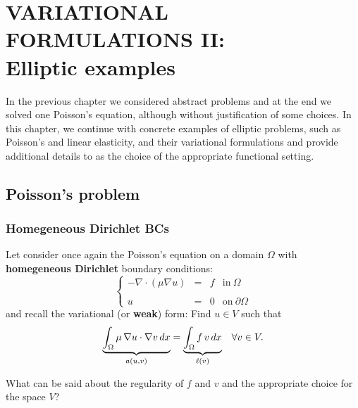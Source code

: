 \setchapterpreamble[u]{\margintoc}
\chapter{VARIATIONAL FORMULATIONS II:\\Elliptic examples}

In the previous chapter we considered abstract problems
and at the end we solved one Poisson's equation, although
without justification of some choices. In this chapter, 
we continue with concrete examples of elliptic problems,
such as Poisson's and linear elasticity, 
and their variational formulations and provide additional
details to as the choice of the appropriate functional
setting.

\section{Poisson's problem}

\subsection{Homegeneous Dirichlet BCs}

Let consider once again the Poisson's equation on a domain
$\Omega$ with \textbf{homegeneous Dirichlet} boundary conditions:
\begin{equation}
\left \{
\begin{array}{rcll}
-\nabla \cdot \left ( \mu \nabla{u} \right) & = & f & \mbox{in}~\Omega \\
& & & \\
u & = & 0 & \mbox{on}~\partial{\Omega}
\end{array}
\right.
\end{equation}
and recall the variational (or \textbf{weak}) form:
Find $u \in V$ such that
\begin{equation}
\begin{array}{ll}
\underbrace{\int_{\Omega}{\mu\,\nabla{u}\cdot \nabla{v}}\,dx}_{a(u,v)} =
        \underbrace{\int_{\Omega}{f\,v}\,dx}_{\ell(v)} & \forall v \in V. \labeq{poissonbasicag}
\end{array}
\end{equation}

What can be said about the regularity of $f$ and $v$ and the appropriate choice
for the space $V$?

